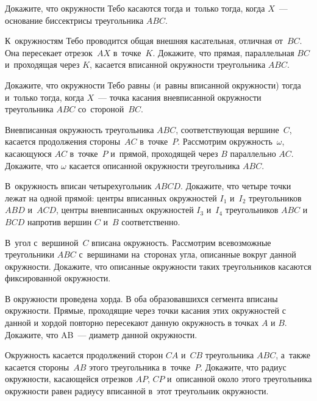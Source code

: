 \begin{problems}

\item
Докажите, что окружности Тебо касаются тогда и~только тогда, когда $X$~---
основание биссектрисы треугольника $ABC$.

\item
К~окружностям Тебо проводится общая внешняя касательная, отличная от~$BC$.
Она пересекает отрезок~$AX$ в~точке~$K$.
Докажите, что прямая, параллельная $BC$ и~проходящая через $K$, касается
вписанной окружности треугольника $ABC$.

\item
Докажите, что окружности Тебо равны (и~равны вписанной окружности) тогда
и~только тогда, когда $X$~--- точка касания вневписанной окружности
треугольника $ABC$ со~стороной~$BC$.

\item
Вневписанная окружность треугольника $ABC$, соответствующая вершине~$C$,
касается продолжения стороны~$AC$ в~точке~$P$.
Рассмотрим окружность~$\omega$, касающуюся $AC$ в~точке~$P$ и~прямой,
проходящей через $B$ параллельно $AC$.
Докажите, что $\omega$ касается описанной окружности треугольника $ABC$.

\item
В~окружность вписан четырехугольник $ABCD$.
Докажите, что четыре точки лежат на одной прямой:
центры вписанных окружностей $I_{1}$ и~$I_{2}$ треугольников $ABD$ и~$ACD$,
центры вневписанных окружностей $I_{3}$ и~$I_{4}$ треугольников $ABC$ и~$BCD$
напротив вершин $C$ и~$B$ соответственно.

\item
В~угол с~вершиной~$C$ вписана окружность.
Рассмотрим всевозможные треугольники $ABC$ с~вершинами на~сторонах угла,
описанные вокруг данной окружности.
Докажите, что описанные окружности таких треугольников касаются фиксированной
окружности.

\iffalse

\item
В окружности проведена хорда.
В оба образовавшихся сегмента вписаны окружности.
Прямые, проходящие через точки касания этих окружностей с данной и хордой
повторно пересекают данную окружность в точках $A$ и $B$.
Докажите, что AB~--- диаметр данной окружности.

\item
Окружность касается продолжений сторон $CA$ и~$CB$ треугольника $ABC$, а~также
касается стороны~$AB$ этого треугольника в~точке~$P$.
Докажите, что радиус окружности, касающейся отрезков $AP$, $CP$ и~описанной
около этого треугольника окружности равен радиусу вписанной в~этот треугольник
окружности.


\end{problems}
